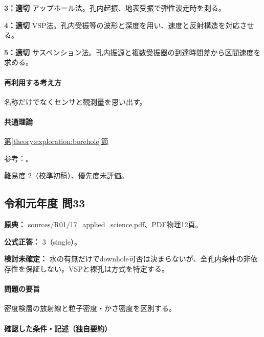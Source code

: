 \noindent\textbf{3：適切} アップホール法。孔内起振、地表受振で弾性波走時を測る。\par

\noindent\textbf{4：適切} VSP法。孔内受振等の波形と深度を用い、速度と反射構造を対応させる。\par

\noindent\textbf{5：適切} サスペンション法。孔内振源と複数受振器の到達時間差から区間速度を求める。\par

\paragraph{再利用する考え方} 名称だけでなくセンサと観測量を思い出す。

\paragraph{共通理論} \hyperref[theory:exploration:borehole]{第\ref*{theory:exploration:borehole}節}

\par 参考：\cite{epa_borehole_resistivity,geebec_ps,oyo_suspension}。

\par 難易度 2（校準初稿）、優先度未評価。

\subsection{令和元年度 問33}
\label{q:r01-reg-applied-33}

\noindent\textbf{原典：} sources/R01/17\_applied\_science.pdf、PDF物理12頁。

\textbf{公式正答：} 3（single）。

\par\textbf{検討未確定：} 水の有無だけでdownhole可否は決まらないが、全孔内条件の非依存性を保証しない。VSPと裸孔は方式を特定する。

\paragraph{問題の要旨} 密度検層の放射線と粒子密度・かさ密度を区別する。

\paragraph{確認した条件・記述（独自要約）}\mbox{}\par

